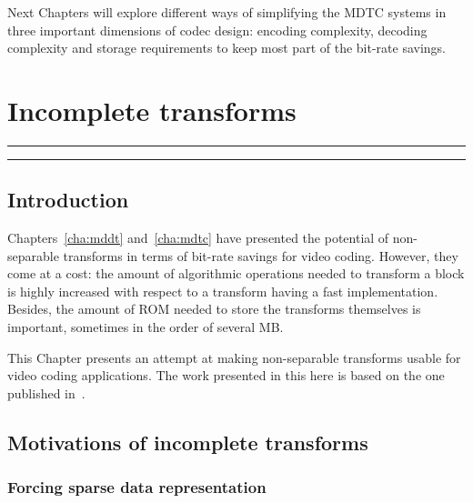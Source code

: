 \documentclass[11pt,a4paper,openright,twoside]{book}
\providecommand{\chaptertoc}{
	\startcontents[chapters]
	\hrule
	\vspace{1em}
	\printcontents[chapters]{}{1}{{\sf\large\bfseries Contents}}
	\hrule
}
\numberwithin{equation}{section} %
\numberwithin{figure}{section} %
\numberwithin{table}{section} %
\begin{document}
Next Chapters will explore different ways of simplifying the \ac{MDTC} systems
in three important dimensions of codec design:
encoding complexity, decoding complexity and storage
requirements to keep most part of the bit-rate savings.

\chapter{Incomplete transforms}
\label{cha:incomplete_transforms}
\chaptertoc

\section{Introduction}
\label{sec:it_introduction}

Chapters~\ref{cha:mddt} and~\ref{cha:mdtc} have presented the potential of
non-separable transforms in terms of bit-rate savings for video coding.
However, they come at a cost:
the amount of algorithmic operations needed to transform a block is highly
increased with respect to a transform having a fast implementation.
Besides, the amount of \acs{ROM} needed to store the transforms themselves is
important, sometimes in the order of several MB.

This Chapter presents an attempt at making non-separable transforms usable for
video coding applications.
The work presented in this here is based on the one published
in~\cite{arrufat-15-inc-transforms}.

\section{Motivations of incomplete transforms}
\label{sec:it_motivations}

\subsection{Forcing sparse data representation}
\label{sub:it_forcing_sparse_data_representation}
\end{document}
